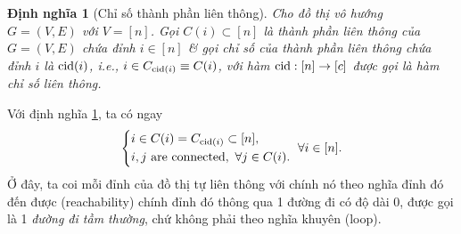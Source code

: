 \documentclass{article}
\newtheorem{dinhnghia}{Định nghĩa}
\begin{document}
\begin{dinhnghia}[Chỉ số thành phần liên thông]
    \label{def: index component}
    Cho đồ thị vô hướng $G = (V,E)$ với $V = [n]$. Gọi $C(i)\subset[n]$ là thành phần liên thông của $G = (V,E)$ chứa đỉnh $i\in[n]$ \& gọi chỉ số của thành phần liên thông chứa đỉnh $i$ là ${\rm cid}(i)$, i.e., $i\in C_{{\rm cid}(i)}\equiv C(i)$, với hàm ${\rm cid}:[n]\to[c]$ được gọi là {\rm hàm chỉ số liên thông}.
\end{dinhnghia}
Với định nghĩa \ref{def: index component}, ta có ngay
\begin{equation*}
    \left\{\begin{split}
        &i\in C(i) = C_{{\rm cid}(i)}\subset[n],\\
        &i,j\mbox{ are connected},\ \forall j\in C(i).
    \end{split}\right.\ \forall i\in[n].
\end{equation*}
Ở đây, ta coi mỗi đỉnh của đồ thị tự liên thông với chính nó theo nghĩa đỉnh đó đến được (reachability) chính đỉnh đó thông qua 1 đường đi có độ dài 0, được gọi là 1 {\it đường đi tầm thường}, chứ không phải theo nghĩa khuyên (loop).
\end{document}
